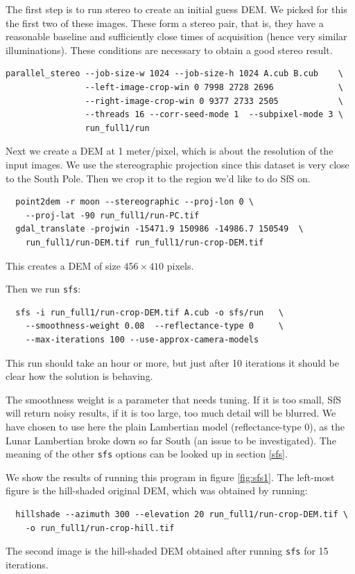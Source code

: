 The first step is to run stereo to create an initial guess DEM. We
picked for this the first two of these images. These form a stereo pair,
that is, they have a reasonable baseline and sufficiently close times of
acquisition (hence very similar illuminations). These conditions are
necessary to obtain a good stereo result.
\begin{verbatim}
parallel_stereo --job-size-w 1024 --job-size-h 1024 A.cub B.cub    \
                --left-image-crop-win 0 7998 2728 2696             \
                --right-image-crop-win 0 9377 2733 2505            \
                --threads 16 --corr-seed-mode 1  --subpixel-mode 3 \
                run_full1/run
\end{verbatim}
Next we create a DEM at 1 meter/pixel, which is about the resolution
of the input images. We use the stereographic projection since this
dataset is very close to the South Pole. Then we crop it to the region
we'd like to do SfS on.
\begin{verbatim}
  point2dem -r moon --stereographic --proj-lon 0 \
    --proj-lat -90 run_full1/run-PC.tif
  gdal_translate -projwin -15471.9 150986 -14986.7 150549  \
    run_full1/run-DEM.tif run_full1/run-crop-DEM.tif
\end{verbatim}
This creates a DEM of size $456 \times 410$ pixels.

Then we run \texttt{sfs}:
\begin{verbatim}
  sfs -i run_full1/run-crop-DEM.tif A.cub -o sfs/run   \
    --smoothness-weight 0.08  --reflectance-type 0     \
    --max-iterations 100 --use-approx-camera-models
\end{verbatim}
This run should take an hour or more, but just after 10 iterations
it should be clear how the solution is behaving.

The smoothness weight is a parameter that needs tuning. If it is too
small, SfS will return noisy results, if it is too large, too much
detail will be blurred. We have chosen to use here the plain Lambertian
model (reflectance-type 0), as the Lunar Lambertian broke down so far
South (an issue to be investigated). The meaning of the other
\texttt{sfs} options can be looked up in section \ref{sfs}.

We show the results of running this program in figure
\ref{fig:sfs1}. The left-most figure is the hill-shaded original DEM,
which was obtained by running:
\begin{verbatim}
  hillshade --azimuth 300 --elevation 20 run_full1/run-crop-DEM.tif \
    -o run_full1/run-crop-hill.tif 
\end{verbatim}
The second image is the hill-shaded DEM obtained after running
\texttt{sfs} for 15 iterations.


